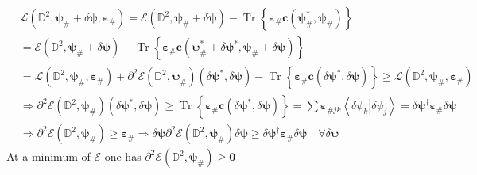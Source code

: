 \documentclass[aps,preprint]{revtex4}%
\begin{document}
\begin{align}
&  \mathcal{L}\left(  \mathbb{D}^{2}\mathbf{,\psi}_{\#}+\delta\mathbf{\psi
},\mathbf{\varepsilon}_{\#}\right)  =\mathcal{E}\left(  \mathbb{D}%
^{2}\mathbf{,\psi}_{\#}+\delta\mathbf{\psi}\right)  -\operatorname{Tr}\left\{
\mathbf{\varepsilon}_{\#}\mathbf{c}\left(  \mathbf{\psi}_{\#}^{\ast
},\mathbf{\psi}_{\#}\right)  \right\} \\
&  =\mathcal{E}\left(  \mathbb{D}^{2}\mathbf{,\psi}_{\#}+\delta\mathbf{\psi
}\right)  -\operatorname{Tr}\left\{  \mathbf{\varepsilon}_{\#}\mathbf{c}%
\left(  \mathbf{\psi}_{\#}^{\ast}+\delta\mathbf{\psi}^{\ast},\mathbf{\psi
}_{\#}+\delta\mathbf{\psi}\right)  \right\} \\
&  =\mathcal{L}\left(  \mathbb{D}^{2}\mathbf{,\psi}_{\#},\mathbf{\varepsilon
}_{\#}\right)  +\partial^{2}\mathcal{E}\left(  \mathbb{D}^{2}\mathbf{,\psi
}_{\#}\right)  \left(  \delta\mathbf{\psi}^{\ast}\mathbf{,}\delta\mathbf{\psi
}\right)  -\operatorname{Tr}\left\{  \mathbf{\varepsilon}_{\#}\mathbf{c}%
\left(  \delta\mathbf{\psi}^{\ast},\delta\mathbf{\psi}\right)  \right\}
\geq\mathcal{L}\left(  \mathbb{D}^{2}\mathbf{,\psi}_{\#},\mathbf{\varepsilon
}_{\#}\right) \\
&  \Rightarrow\partial^{2}\mathcal{E}\left(  \mathbb{D}^{2}\mathbf{,\psi}%
_{\#}\right)  \left(  \delta\mathbf{\psi}^{\ast}\mathbf{,}\delta\mathbf{\psi
}\right)  \geq\operatorname{Tr}\left\{  \mathbf{\varepsilon}_{\#}%
\mathbf{c}\left(  \delta\mathbf{\psi}^{\ast},\delta\mathbf{\psi}\right)
\right\}  =\sum\mathbf{\varepsilon}_{\#jk}\left\langle \left.  \delta\psi
_{k}\right\vert \delta\psi_{j}\right\rangle =\delta\mathbf{\psi}^{\dagger
}\mathbf{\varepsilon}_{\#}\delta\mathbf{\psi}\\
&  \Rightarrow\partial^{2}\mathcal{E}\left(  \mathbb{D}^{2}\mathbf{,\psi}%
_{\#}\right)  \geq\mathbf{\varepsilon}_{\#}\Rightarrow\delta\mathbf{\psi
}\partial^{2}\mathcal{E}\left(  \mathbb{D}^{2}\mathbf{,\psi}_{\#}\right)
\delta\mathbf{\psi\geq}\delta\mathbf{\psi}^{\dagger}\mathbf{\varepsilon}%
_{\#}\delta\mathbf{\psi\quad\forall}\delta\mathbf{\psi}%
\end{align}
At a minimum of $\mathcal{E}$ one has $\partial^{2}\mathcal{E}\left(
\mathbb{D}^{2}\mathbf{,\psi}_{\#}\right)  \geq\mathbf{0}$
\end{document}
